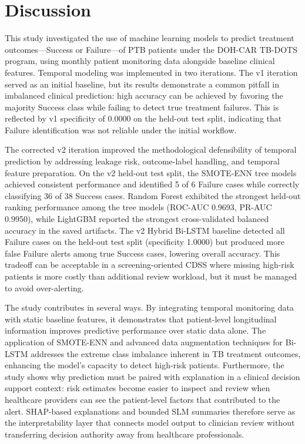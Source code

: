 \documentclass[12pt]{article}
\begin{document}

\section{Discussion}

This study investigated the use of machine learning models to predict treatment outcomes---Success or Failure---of PTB patients under the DOH-CAR TB-DOTS program, using monthly patient monitoring data alongside baseline clinical features. Temporal modeling was implemented in two iterations. The v1 iteration served as an initial baseline, but its results demonstrate a common pitfall in imbalanced clinical prediction: high accuracy can be achieved by favoring the majority Success class while failing to detect true treatment failures. This is reflected by v1 specificity of 0.0000 on the held-out test split, indicating that Failure identification was not reliable under the initial workflow.

The corrected v2 iteration improved the methodological defensibility of temporal prediction by addressing leakage risk, outcome-label handling, and temporal feature preparation. On the v2 held-out test split, the SMOTE-ENN tree models achieved consistent performance and identified 5 of 6 Failure cases while correctly classifying 36 of 38 Success cases. Random Forest exhibited the strongest held-out ranking performance among the tree models (ROC-AUC 0.9693, PR-AUC 0.9950), while LightGBM reported the strongest cross-validated balanced accuracy in the saved artifacts. The v2 Hybrid Bi-LSTM baseline detected all Failure cases on the held-out test split (specificity 1.0000) but produced more false Failure alerts among true Success cases, lowering overall accuracy. This tradeoff can be acceptable in a screening-oriented CDSS where missing high-risk patients is more costly than additional review workload, but it must be managed to avoid over-alerting.

The study contributes in several ways. By integrating temporal monitoring data with static baseline features, it demonstrates that patient-level longitudinal information improves predictive performance over static data alone. The application of SMOTE-ENN and advanced data augmentation techniques for Bi-LSTM addresses the extreme class imbalance inherent in TB treatment outcomes, enhancing the model's capacity to detect high-risk patients. Furthermore, the study shows why prediction must be paired with explanation in a clinical decision support context: risk estimates become easier to inspect and review when healthcare providers can see the patient-level factors that contributed to the alert. SHAP-based explanations and bounded SLM summaries therefore serve as the interpretability layer that connects model output to clinician review without transferring decision authority away from healthcare professionals.
\end{document}
